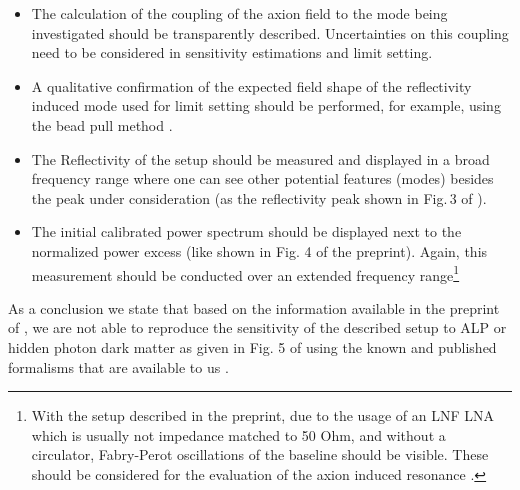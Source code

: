 \documentclass{article}
\begin{document}
\begin{itemize}
\item The calculation of the coupling of the axion field to the mode being investigated should be transparently described. Uncertainties on this coupling need to be considered in sensitivity estimations and limit setting.
\item A qualitative confirmation of the expected field shape of the reflectivity induced mode used for limit setting should be performed, for example, using the bead pull method \cite{Egge_2024}. 
\item The Reflectivity of the setup should be measured and displayed in a broad frequency range where one can see other potential features (modes) besides the peak under consideration (as the reflectivity peak shown in Fig.\,3 of \cite{demiguel2026limitsaxiondarkmatter}).
\item The initial calibrated power spectrum should be displayed next to the normalized power excess (like shown in Fig. 4 of the preprint). Again, this measurement should be conducted over an extended frequency range\footnote{With the setup described in the preprint, due to the usage of an LNF LNA  which is usually not impedance matched to 50 Ohm, and without a circulator, Fabry-Perot oscillations of the baseline should be visible. These should be considered for the evaluation of the axion induced resonance \cite{MADMAX1}.} 

\end{itemize}


As a conclusion we state that based on the information available in the preprint of \cite{demiguel2026limitsaxiondarkmatter}, we are not able to reproduce the sensitivity of the described setup to ALP or hidden photon dark matter as given in Fig. 5 of \cite{demiguel2026limitsaxiondarkmatter} using the known and published formalisms that are available to us \cite{MADMAX1, MADMAX2, MADMAX3, Egge_2024, Egge_2023, MADMAX4, MADMAX_PoP_2020, Knirck_2019, Millar_2017, MADMAX_PRL_2017}.

{\small
\renewcommand{\refname}{}


}

%
\end{document}

